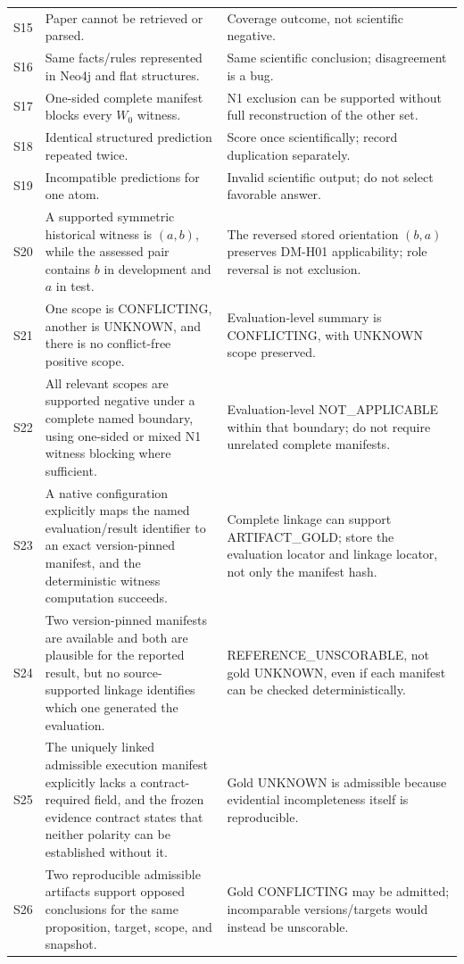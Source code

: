 \documentclass[11pt,a4paper]{article}
\begin{document}
\begin{longtable}{@{}L{13mm}L{75mm}L{63mm}@{}}
S15 & Paper cannot be retrieved or parsed. & Coverage outcome, not scientific negative.\\
S16 & Same facts/rules represented in Neo4j and flat structures. & Same scientific conclusion; disagreement is a bug.\\
S17 & One-sided complete manifest blocks every $W_0$ witness. & N1 exclusion can be supported without full reconstruction of the other set.\\
S18 & Identical structured prediction repeated twice. & Score once scientifically; record duplication separately.\\
S19 & Incompatible predictions for one atom. & Invalid scientific output; do not select favorable answer.\\
S20 & A supported symmetric historical witness is $(a,b)$, while the assessed pair contains $b$ in development and $a$ in test. & The reversed stored orientation $(b,a)$ preserves DM-H01 applicability; role reversal is not exclusion.\\
S21 & One scope is CONFLICTING, another is UNKNOWN, and there is no conflict-free positive scope. & Evaluation-level summary is CONFLICTING, with UNKNOWN scope preserved.\\
S22 & All relevant scopes are supported negative under a complete named boundary, using one-sided or mixed N1 witness blocking where sufficient. & Evaluation-level NOT\_APPLICABLE within that boundary; do not require unrelated complete manifests.\\
S23 & A native configuration explicitly maps the named evaluation/result identifier to an exact version-pinned manifest, and the deterministic witness computation succeeds. & Complete linkage can support ARTIFACT\_GOLD; store the evaluation locator and linkage locator, not only the manifest hash.\\
S24 & Two version-pinned manifests are available and both are plausible for the reported result, but no source-supported linkage identifies which one generated the evaluation. & REFERENCE\_UNSCORABLE, not gold UNKNOWN, even if each manifest can be checked deterministically.\\
S25 & The uniquely linked admissible execution manifest explicitly lacks a contract-required field, and the frozen evidence contract states that neither polarity can be established without it. & Gold UNKNOWN is admissible because evidential incompleteness itself is reproducible.\\
S26 & Two reproducible admissible artifacts support opposed conclusions for the same proposition, target, scope, and snapshot. & Gold CONFLICTING may be admitted; incomparable versions/targets would instead be unscorable.\\

\end{longtable}
\end{document}
